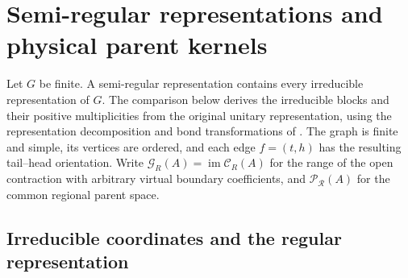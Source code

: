 \section{Semi-regular representations and physical parent kernels}
\label{sec:peps_semiregular_parent_equivalence}

Let $G$ be finite. A semi-regular representation contains every irreducible
representation of $G$. The comparison below derives the irreducible blocks
and their positive multiplicities from the original unitary representation,
using the representation decomposition and bond transformations of
\cite[Sections~4.1 and~7]{Schuch2010PEPS}.
The graph is finite and simple, its vertices are ordered, and each edge
$f=(t,h)$ has the resulting tail--head orientation.
Write $\mathcal G_R(A)=\operatorname{im}\mathcal C_R(A)$ for the range of
the open contraction with arbitrary virtual boundary coefficients, and
$\mathcal P_{\mathcal R}(A)$ for the common regional parent space.

\subsection{Irreducible coordinates and the regular representation}

